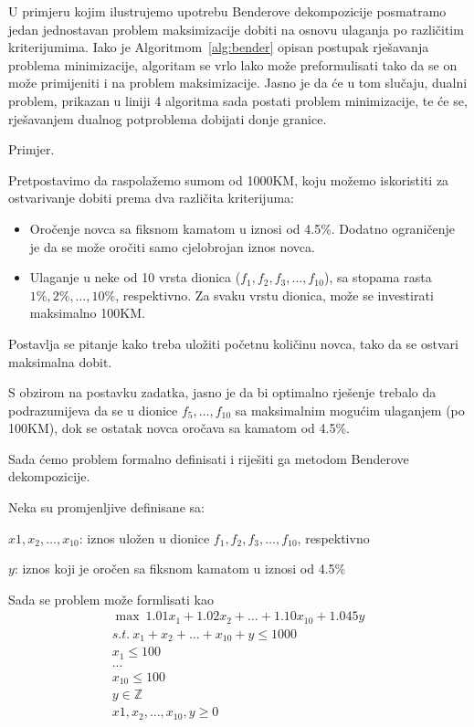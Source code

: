 \documentclass[a4paper, utf8, 11pt, colorlinks]{book}
\begin{document}
U primjeru kojim ilustrujemo upotrebu Benderove dekompozicije posmatramo jedan jednostavan problem maksimizacije dobiti na osnovu ulaganja po različitim kriterijumima.
Iako je Algoritmom~\ref{alg:bender} opisan postupak rješavanja problema minimizacije, algoritam se vrlo lako može preformulisati tako da se on može primijeniti i na problem maksimizacije. Jasno je da će u tom slučaju, dualni problem, prikazan u liniji 4 algoritma sada postati problem minimizacije, te će se, rješavanjem dualnog potproblema dobijati donje granice.


Primjer.

Pretpostavimo da raspolažemo sumom od 1000KM, koju možemo iskoristiti za ostvarivanje dobiti prema dva različita kriterijuma:
\begin{itemize}
	\item Oročenje novca sa fiksnom kamatom u iznosi od 4.5\%. Dodatno ograničenje je da se može oročiti samo cjelobrojan iznos novca.
	
	\item Ulaganje u neke od 10 vrsta dionica ($f_1, f_2, f_3,\ldots,f_{10}$), sa stopama rasta $1\%,2\%,\ldots,10\%$, respektivno. Za svaku vrstu dionica, može se investirati maksimalno 100KM.
\end{itemize}
Postavlja se pitanje kako treba uložiti početnu količinu novca, tako da se ostvari maksimalna dobit.

S obzirom na postavku zadatka, jasno je da bi optimalno rješenje trebalo da podrazumijeva da se u dionice $f_5,\ldots,f_{10}$ sa maksimalnim mogućim ulaganjem (po 100KM), dok se ostatak novca oročava sa kamatom od  4.5\%.

Sada ćemo problem formalno definisati i riješiti ga metodom Benderove dekompozicije.

Neka su promjenljive definisane sa:

$x1,x_2,\ldots,x_{10}$: iznos uložen u dionice $f_1, f_2, f_3,\ldots,f_{10}$, respektivno

$y$: iznos koji je oročen sa fiksnom kamatom u iznosi od 4.5\%

Sada se problem može formlisati kao
\begin{equation}\label{primer:formulacija1}
	\begin{aligned}
		\max\ 1.01x_1+1.02x_2+\ldots+1.10x_{10}+1.045y\\
		s.t.\ x_1+x_2+\ldots+x_{10}+y\leqslant1000\\
		x_1\leqslant 100\\
		...\\
		x_{10}\leqslant 100\\
		y\in \mathbb{Z}\\
		x1,x_2,\ldots,x_{10},y\geqslant 0
	\end{aligned}
\end{equation}
\end{document}
